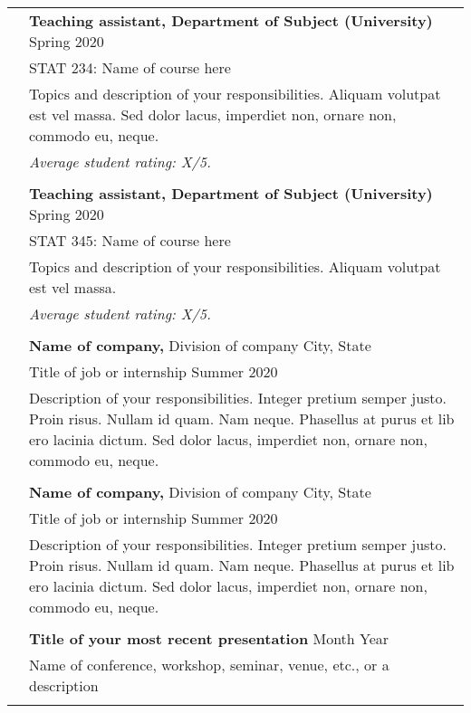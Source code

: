 \documentclass[letterpaper, 11pt]{article}
\begin{document}
\begin{longtable}{p{1.3in}p{4.8in}}
& \textbf{Teaching assistant, Department of Subject (University)} \hfill Spring 2020 \\
& STAT 234: Name of course here \\
& Topics and description of your responsibilities. Aliquam volutpat est vel massa. Sed dolor lacus, imperdiet non, ornare non, commodo eu, neque. \\
& \textit{Average student rating: X/5.} \\
& \\

& \textbf{Teaching assistant, Department of Subject (University)} \hfill Spring 2020 \\
& STAT 345: Name of course here \\
& Topics and description of your responsibilities. Aliquam volutpat est vel massa. \\
& \textit{Average student rating: X/5.} \\
& \\


{\color{OliveGreen}{Industry experience}} 
& {\textbf{Name of company,}} Division of company \hfill City, State\\
& Title of job or internship \hfill Summer 2020 \\
& Description of your responsibilities. Integer pretium semper justo. Proin risus. Nullam id quam. Nam neque. Phasellus at purus et lib ero lacinia dictum. Sed dolor lacus, imperdiet non, ornare non, commodo eu, neque.\\
& \\
 
& {\textbf{Name of company,}} Division of company \hfill City, State\\
& Title of job or internship \hfill Summer 2020 \\
& Description of your responsibilities. Integer pretium semper justo. Proin risus. Nullam id quam. Nam neque. Phasellus at purus et lib ero lacinia dictum. Sed dolor lacus, imperdiet non, ornare non, commodo eu, neque.\\
& \\


{\color{OliveGreen}{Talks and tutorials}} 
& \textbf{Title of your most recent presentation} \hfill Month Year \\
& Name of conference, workshop, seminar, venue, etc., or a description \\
& \\


\end{longtable}
\end{document}
